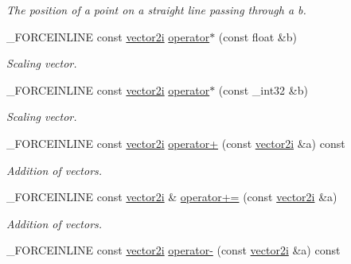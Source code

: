 \begin{DoxyCompactItemize}
\begin{DoxyCompactList}\small\item\em The position of a point on a straight line passing through a b. \end{DoxyCompactList}\item 
\hypertarget{classbt_1_1vector2i_aa645031847456a5a0acf6dedb5c1a117}{\-\_\-\-F\-O\-R\-C\-E\-I\-N\-L\-I\-N\-E const \hyperlink{classbt_1_1vector2i}{vector2i} \hyperlink{classbt_1_1vector2i_aa645031847456a5a0acf6dedb5c1a117}{operator$\ast$} (const float \&b)}\label{classbt_1_1vector2i_aa645031847456a5a0acf6dedb5c1a117}

\begin{DoxyCompactList}\small\item\em Scaling vector. \end{DoxyCompactList}\item 
\hypertarget{classbt_1_1vector2i_aec6004a94d79f6cc8b921f77a2aa949d}{\-\_\-\-F\-O\-R\-C\-E\-I\-N\-L\-I\-N\-E const \hyperlink{classbt_1_1vector2i}{vector2i} \hyperlink{classbt_1_1vector2i_aec6004a94d79f6cc8b921f77a2aa949d}{operator$\ast$} (const \-\_\-int32 \&b)}\label{classbt_1_1vector2i_aec6004a94d79f6cc8b921f77a2aa949d}

\begin{DoxyCompactList}\small\item\em Scaling vector. \end{DoxyCompactList}\item 
\hypertarget{classbt_1_1vector2i_a8d1cccb854368efb17865f2ac4a02ee5}{\-\_\-\-F\-O\-R\-C\-E\-I\-N\-L\-I\-N\-E const \hyperlink{classbt_1_1vector2i}{vector2i} \hyperlink{classbt_1_1vector2i_a8d1cccb854368efb17865f2ac4a02ee5}{operator+} (const \hyperlink{classbt_1_1vector2i}{vector2i} \&a) const }\label{classbt_1_1vector2i_a8d1cccb854368efb17865f2ac4a02ee5}

\begin{DoxyCompactList}\small\item\em Addition of vectors. \end{DoxyCompactList}\item 
\hypertarget{classbt_1_1vector2i_ac555a7b1960e9a847dcecc2c993e8259}{\-\_\-\-F\-O\-R\-C\-E\-I\-N\-L\-I\-N\-E const \hyperlink{classbt_1_1vector2i}{vector2i} \& \hyperlink{classbt_1_1vector2i_ac555a7b1960e9a847dcecc2c993e8259}{operator+=} (const \hyperlink{classbt_1_1vector2i}{vector2i} \&a)}\label{classbt_1_1vector2i_ac555a7b1960e9a847dcecc2c993e8259}

\begin{DoxyCompactList}\small\item\em Addition of vectors. \end{DoxyCompactList}\item 
\hypertarget{classbt_1_1vector2i_a0bcc5abda5c6413d66d372a4ba933c63}{\-\_\-\-F\-O\-R\-C\-E\-I\-N\-L\-I\-N\-E const \hyperlink{classbt_1_1vector2i}{vector2i} \hyperlink{classbt_1_1vector2i_a0bcc5abda5c6413d66d372a4ba933c63}{operator-\/} (const \hyperlink{classbt_1_1vector2i}{vector2i} \&a) const }\label{classbt_1_1vector2i_a0bcc5abda5c6413d66d372a4ba933c63}


\end{DoxyCompactItemize}

